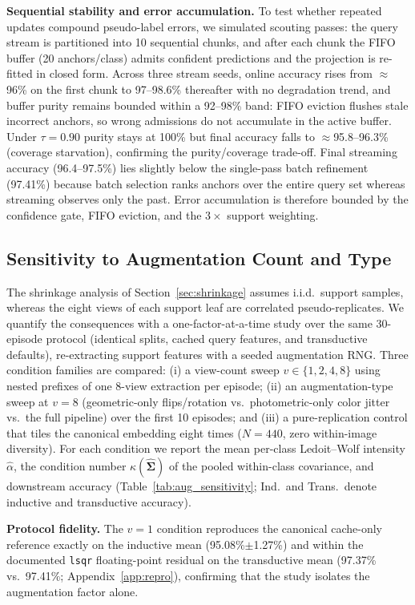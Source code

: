 \documentclass[preprint,12pt]{elsarticle}
\begin{document}
\textbf{Sequential stability and error accumulation.} To test whether repeated updates compound pseudo-label errors, we simulated scouting passes: the query stream is partitioned into 10 sequential chunks, and after each chunk the FIFO buffer (20 anchors/class) admits confident predictions and the projection is re-fitted in closed form. Across three stream seeds, online accuracy rises from $\approx$96\% on the first chunk to 97--98.6\% thereafter with no degradation trend, and buffer purity remains bounded within a 92--98\% band: FIFO eviction flushes stale incorrect anchors, so wrong admissions do not accumulate in the active buffer. Under $\tau = 0.90$ purity stays at 100\% but final accuracy falls to $\approx$95.8--96.3\% (coverage starvation), confirming the purity/coverage trade-off. Final streaming accuracy (96.4--97.5\%) lies slightly below the single-pass batch refinement (97.41\%) because batch selection ranks anchors over the entire query set whereas streaming observes only the past. Error accumulation is therefore bounded by the confidence gate, FIFO eviction, and the $3\times$ support weighting.

\subsection{Sensitivity to Augmentation Count and Type}
\label{sec:aug_sensitivity}
The shrinkage analysis of Section~\ref{sec:shrinkage} assumes i.i.d.\ support samples, whereas the eight views of each support leaf are correlated pseudo-replicates. We quantify the consequences with a one-factor-at-a-time study over the same 30-episode protocol (identical splits, cached query features, and transductive defaults), re-extracting support features with a seeded augmentation RNG. Three condition families are compared: (i) a view-count sweep $v\in\{1,2,4,8\}$ using nested prefixes of one 8-view extraction per episode; (ii) an augmentation-type sweep at $v=8$ (geometric-only flips/rotation vs.\ photometric-only color jitter vs.\ the full pipeline) over the first 10 episodes; and (iii) a pure-replication control that tiles the canonical embedding eight times ($N=440$, zero within-image diversity). For each condition we report the mean per-class Ledoit--Wolf intensity $\hat{\alpha}$, the condition number $\kappa(\hat{\mathbf{\Sigma}})$ of the pooled within-class covariance, and downstream accuracy (Table~\ref{tab:aug_sensitivity}; Ind.\ and Trans.\ denote inductive and transductive accuracy).

\textbf{Protocol fidelity.} The $v=1$ condition reproduces the canonical cache-only reference exactly on the inductive mean (95.08\%$\pm$1.27\%) and within the documented \texttt{lsqr} floating-point residual on the transductive mean (97.37\% vs.\ 97.41\%; Appendix~\ref{app:repro}), confirming that the study isolates the augmentation factor alone.
\end{document}
